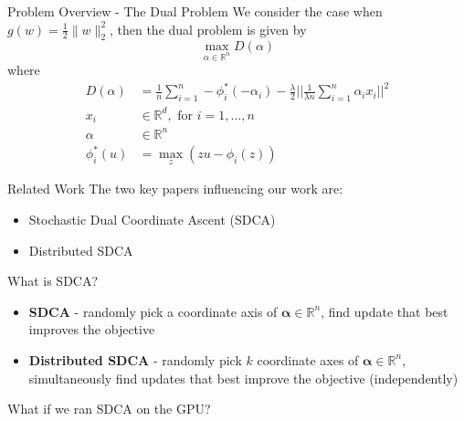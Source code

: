 \documentclass{beamer}
\def \R {\mathbb{R}}
\def \R {\mathbb{R}}
\begin{document}
\begin{frame}{Problem Overview - The Dual Problem}
  We consider the case when $g(w)=\frac{1}{2}\|w\|_2^2$, then the dual problem is given by
  \vspace{1em}
  \begin{equation}
    \max_{\alpha \in \R^n} D(\alpha)
  \end{equation}
  where 
  \begin{align*}
    D(\alpha) &= \frac{1}{n}\sum_{i=1}^n -\phi^*_i(-\alpha_i) -
    \frac{\lambda}{2}\Big|\Big|\frac{1}{\lambda n}\sum_{i=1}^n\alpha_i x_i\Big|\Big|^2\\
    x_i & \in \R^d, \text{ for } i = 1, \dots, n\\
    \alpha & \in \R^n\\
    \phi^*_i(u) &= \max_z (zu - \phi_i(z))
  \end{align*}
\end{frame}
%
\begin{frame}{Related Work}
  The two key papers influencing our work are:
	\begin{itemize}
	  \item  Stochastic Dual Coordinate Ascent (SDCA) \cite{shalev2013stochastic}
	  \item Distributed SDCA  \cite{yang2013trading,yang2013analysis}
	\end{itemize}
\end{frame}

\begin{frame}{What is SDCA?}
  \begin{itemize}
    \item \textbf{SDCA} - randomly pick a coordinate axis of $\mathbf{\alpha}
      \in \R^n$, find update that best improves
      the objective\vspace{1em}
    \item \textbf{Distributed SDCA} - randomly pick $k$ coordinate axes of
      $\mathbf{\alpha} \in \R^n$, simultaneously
      find updates that best improve the objective (independently)
  \end{itemize}
\end{frame}

\begin{frame}[standout]
  What if we ran SDCA on the GPU?
\end{frame}
\end{document}
